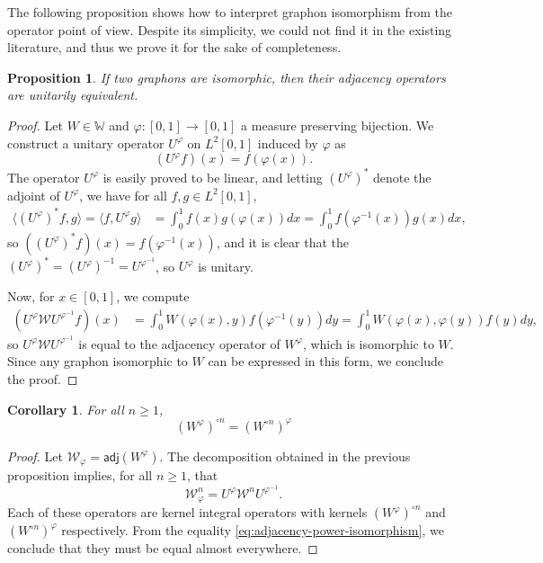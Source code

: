 \documentclass[11pt]{article}
\def\WW{\mathbb{W}}
\def\calW{\mathcal{W}}
\newcommand{\sans}[1]{\mathsf{#1}}
\def\adj{\sans{adj}}
\newtheorem{corollary}{Corollary}[section]
\newtheorem{proposition}{Proposition}[section]
\theoremstyle{definition}
\begin{document}
The following proposition shows how to interpret graphon isomorphism from the operator point of view. Despite its simplicity, we could not find it in the existing literature, and thus we prove it for the sake of completeness.
\begin{proposition} \label{prop:isomorphic-graphon-unitary}
    If two graphons are isomorphic, then their adjacency operators are unitarily equivalent.
\end{proposition}
\begin{proof}
    Let $W \in \WW$ and $\varphi: [0,1]\rightarrow [0,1]$ a measure preserving bijection. We construct a unitary operator $U^\varphi$ on $L^2 [0,1]$ induced by $\varphi$ as
    $$ (U^\varphi f)(x) = f(\varphi(x)). $$
    The operator $U^\varphi$ is easily proved to be linear, and letting $(U^\varphi)^*$ denote the adjoint of $U^\varphi$, we have for all $f,g\in L^2 [0,1]$,
    \begin{align*}
        \langle (U^\varphi)^* f, g\rangle = \langle f, U^\varphi g\rangle &= \int_0^1 f(x) g(\varphi(x)) dx = \int_0^1 f(\varphi^{-1}(x)) g(x) dx,
    \end{align*}
    so $((U^\varphi)^* f)(x) = f(\varphi^{-1}(x))$, and it is clear that the $(U^\varphi)^* = (U^\varphi)^{-1} = U^{\varphi^{-1}}$, so $U^\varphi$ is unitary.

    Now, for $x\in [0,1]$, we compute
    \begin{align*}
        (U^\varphi \calW U^{\varphi^{-1}} f)(x) & = \int_0^1 W(\varphi(x), y) f(\varphi^{-1}(y)) dy = \int_0^1 W(\varphi(x), \varphi(y)) f(y) dy,
    \end{align*}
    so $U^\varphi \calW U^{\varphi^{-1}}$ is equal to the adjacency operator of $W^\varphi$, which is isomorphic to $W$. Since any graphon isomorphic to $W$ can be expressed in this form, we conclude the proof.
\end{proof}

\begin{corollary} \label{coro:powers-isomorphism}
    For all $n\ge 1$,
    $$ (W^\varphi)^{\circ n} = (W^{\circ n})^\varphi $$
\end{corollary}
\begin{proof}
    Let $\calW_\varphi = \adj(W^\varphi)$. The decomposition obtained in the previous proposition implies, for all $n\ge 1$, that
    \begin{equation} \label{eq:adjacency-power-isomorphism}
        \calW^n_\varphi = U^\varphi \calW^n U^{\varphi^{-1}}.
    \end{equation}
    Each of these operators are kernel integral operators with kernels $(W^\varphi)^{\circ n}$ and $(W^{\circ n})^{\varphi}$ respectively. From the equality \eqref{eq:adjacency-power-isomorphism}, we conclude that they must be equal almost everywhere.
\end{proof}
\end{document}
